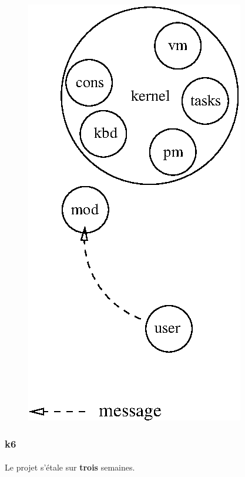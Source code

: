 \documentclass[10pt,a4wide]{article}
\begin{document}
\begin{figure}[h]
\centerline{\includegraphics{figures/k5.eps}}
\end{figure}

\newpage

\subsubsection{k6}

\paragraph{}

Le projet s'\'etale sur \textbf{trois} semaines.

\paragraph{}
\end{document}
